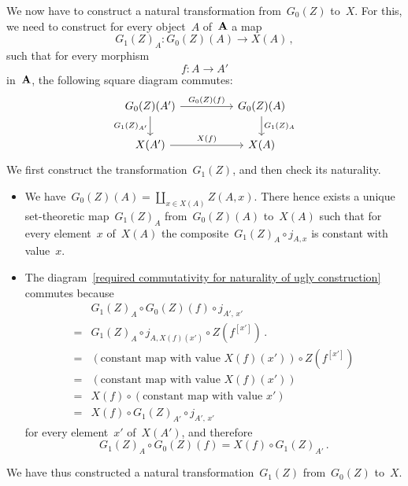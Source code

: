 We now have to construct a natural transformation from~$G_0(Z)$ to~$X$.
For this, we need to construct for every object~$A$ of~$\mathbf{A}$ a map
\[
	G_1(Z)_A \colon G_0(Z)(A) \to X(A) \,,
\]
such that for every morphism
\[
	f \colon A \to A'
\]
in~$\mathbf{A}$, the following square diagram commutes:
\begin{equation}
	\label{required commutativity for naturality of ugly construction}
	\begin{tikzcd}[column sep = huge]
		G_0(Z)(A')
		\arrow{r}[above]{G_0(Z)(f)}
		\arrow{d}[left]{G_1(Z)_{A'}}
		&
		G_0(Z)(A)
		\arrow{d}[right]{G_1(Z)_A}
		\\
		X(A')
		\arrow{r}[above]{X(f)}
		&
		X(A)
	\end{tikzcd}
\end{equation}
We first construct the transformation~$G_1(Z)$, and then check its naturality.
\begin{itemize}

	\item
		We have~$G_0(Z)(A) = ∐_{x ∈ X(A)} Z(A, x)$.
		There hence exists a unique set-theoretic map~$G_1(Z)_A$ from~$G_0(Z)(A)$ to~$X(A)$ such that for every element~$x$ of~$X(A)$ the composite~$G_1(Z)_A ∘ j_{A, x}$ is constant with value~$x$.

	\item
		The diagram~\eqref{required commutativity for naturality of ugly construction} commutes because
		\begin{align*}
			{}&
			G_1(Z)_A ∘ G_0(Z)(f) ∘ j_{A',\, x'}
			\\
			={}&
			G_1(Z)_A ∘ j_{A, X(f)(x')} ∘ Z(f^{[x']}) \,.
			\\
			={}&
			(\text{constant map with value~$X(f)(x')$}) ∘ Z(f^{[x']})
			\\
			={}&
			(\text{constant map with value~$X(f)(x')$})
			\\
			={}&
			X(f) ∘ (\text{constant map with value~$x'$})
			\\
			={}&
			X(f) ∘ G_1(Z)_{A'} ∘ j_{A',\, x'}
		\end{align*}
		for every element~$x'$ of~$X(A')$, and therefore
		\[
			G_1(Z)_A ∘ G_0(Z)(f) = X(f) ∘ G_1(Z)_{A'} \,.
		\]

\end{itemize}
We have thus constructed a natural transformation~$G_1(Z)$ from~$G_0(Z)$ to~$X$.

